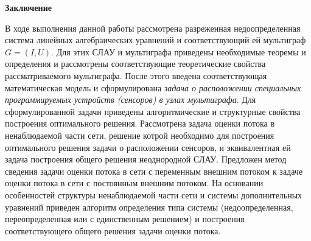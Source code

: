 \documentclass[14pt]{extarticle}%
\begin{document}


\newpage
\begin{center}
    \textbf{Заключение}
\end{center}

В ходе выполнения данной работы рассмотрена разреженная недоопределенная система линейных алгебраических уравнений и соответствующий ей мультиграф $G=(I, U)$. Для этих СЛАУ и мультиграфа приведены необходимые теоремы и определения и рассмотрены соответствующие теоретические свойства рассматриваемого мультиграфа. После этого введена соответствующая математическая модель и сформулирована {\it задача о расположении специальных программируемых устройств (сенсоров) в узлах мультиграфа}. Для сформулированной задачи приведены алгоритмические и структурные свойства построения оптимального решения. Рассмотрена задача оценки потока в ненаблюдаемой части сети, решение котрой необходимо для построения оптимального решения задачи о расположении сенсоров, и эквивалентная ей задача построения общего решения неоднородной СЛАУ. Предложен метод сведения задачи оценки потока в сети с переменным внешним потоком к задаче оценки потока в сети с постоянным внешним потоком. На основании особенностей структуры ненаблюдаемой части сети и системы дополнительных уравнений приведен алгоритм определения типа системы (недоопределенная, переопределенная или с единственным решением) и построения соответствующего общего решения задачи оценки потока.
\end{document}
